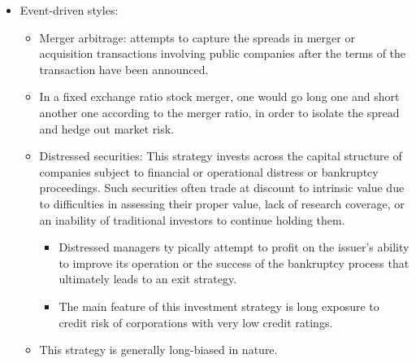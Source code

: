 \begin{itemize}
\begin{itemize}
\begin{itemize}
        \item Focuses on identifying extreme price valuations and leverage is often applied on the anticipated price movements in equity, currency, interest rate and commodity markets.
        \item employs a top-down global approach to concentrated on forecasting how political trends and global macroeconomic events affect the valuation of financial instruments.
        \item Profits can be made by correctly anticipating price movements in global markets and having the flexibility to use a broad investment mandate, with the ability to hold positions in practically any market with any instrument.
        \end{itemize}
    \item Similarity between global macro and managed futures: these managers behave like asset allocators taking bets in different markets utilizing a range of strategies opportunistically.
    \end{itemize}
\item Event-driven styles:
    \begin{itemize}
    \item Merger arbitrage: attempts to capture the spreads in merger or acquisition transactions involving public companies after the terms of the transaction have been announced.
    \item In a fixed exchange ratio stock merger, one would go long one and short another one according to the merger ratio, in order to isolate the spread and hedge out market risk.
    \item Distressed securities: This strategy invests across the capital structure of companies subject to financial or operational distress or bankruptcy proceedings. Such securities often trade at discount to intrinsic value due to difficulties in assessing their proper value, lack of research coverage, or an inability of traditional investors to continue holding them.
        \begin{itemize}
        \item Distressed managers ty pically attempt to profit on the issuer's ability to improve its operation or the success of the bankruptcy process that ultimately leads to an exit strategy.
        \item The main feature of this investment strategy is long exposure to credit risk of corporations with very low credit ratings.
        \end{itemize}
    \item This strategy is generally long-biased in nature.

\end{itemize}
\end{itemize}
